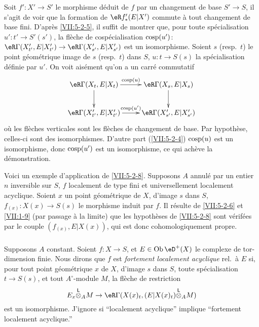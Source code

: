 Soit $f':X'\to S'$ le morphisme déduit de $f$ par un changement de base 
$S'\to S$, il s'agit de voir que la formation de $\eR f_\ast'(E|X')$ commute 
à tout changement de base fini. D'après \ref{VII:5-2-5}, il suffit de 
montrer que, pour toute spécialisation $u':t'\to S'(s')$, la flèche de 
cospécialisation $\operatorname{cosp}(u')$: 
$\eR\Gamma(X_{t'}',E|X_{t'}') \to \eR\Gamma(X_{s'}',E|X_{s'}')$ est un 
isomorphisme. Soient $s$ (resp.\ $t$) le point géométrique image de $s$ 
(resp.\ $t$) dans $S$, $u:t\to S(s)$ la spécialisation définie par $u'$. 
On voit aisément qu'on a un carré commutatif 
\[\xymatrix{
  \eR\Gamma(X_t,E|X_t) \ar[r]^-{\cosp(u)} \ar[d] 
    & \eR\Gamma(X_s,E|X_s) \ar[d] \\
  \eR\Gamma(X_{t'}',E|X_{t'}') \ar[r]^-{\cosp(u')} 
    & \eR\Gamma(X_{s'}',E|X_{s'}') 
}\]
où les flèches verticales sont les flèches de changement de base. Par 
hypothèse, celles-ci sont des isomorphismes. D'autre part (\ref{VII:5-2-4}) 
$\operatorname{cosp}(u)$ est un isomorphisme, donc $\operatorname{cosp}(u')$ est un isomorphisme, ce qui 
achève la démonstration. 

Voici un exemple d'application de \ref{VII:5-2-8}. Supposons $A$ annulé par 
un entier $n$ inversible sur $S$, $f$ localement de type fini et 
universellement localement acyclique. Soient $x$ un point géométrique de 
$X$, d'image $s$ dans $S$, $f_{(x)}:X(x)\to S(s)$ le morphisme induit par $f$. 
Il résulte de \ref{VII:5-2-6} et \ref{VII:1-9} (par passage à la limite) 
que les hypothèses de \ref{VII:5-2-8} sont vérifées par le couple 
$(f_{(x)},E|X(x))$, qui est donc cohomologiquement propre. 





\subsubsection{}\label{VII:5-2-9}

Supposons $A$ constant. Soient $f:X\to S$, et $E\in\ob\eD^+(X)$ le complexe de 
tor-dimension finie. Nous dirons que $f$ est \emph{fortement localement 
acyclique} rel.\ à $E$ si, pour tout point géométrique $x$ de $X$, 
d'image $s$ dans $S$, toute spécialisation $t\to S(s)$, et tout 
$A^\circ$-module $M$, la flèche de restriction 
\[
  E_x\lotimes_A M \to \eR\Gamma(X(x)_t,(E|X(x)_t)\lotimes_A M) 
\]
est un isomorphisme. J'ignore si ``localement acyclique'' implique 
``fortement localement acyclique.'' 





